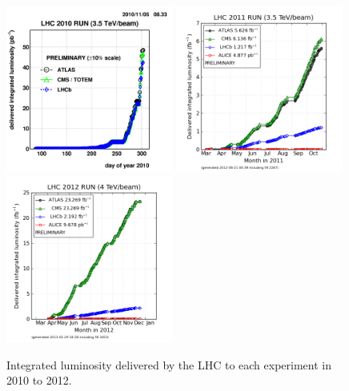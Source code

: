 \begin{figure}[htb]
\centering
\includegraphics[width=0.49\textwidth]{Experiment/2010_lhc_luminocity.png}
\includegraphics[width=0.49\textwidth]{Experiment/2011_lhc_luminocity.png}
\includegraphics[width=0.49\textwidth]{Experiment/2012_lhc_luminocity.png}
\caption{Integrated luminosity delivered by the LHC to each experiment in 2010 to 2012.~\cite{lhc_lumi_plots}}
\label{fig:lhc_luminocity}
\end{figure}






